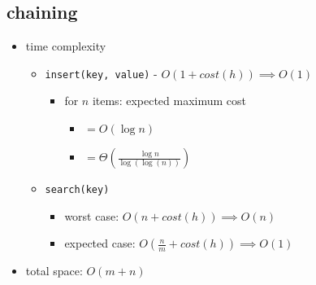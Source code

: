 \documentclass{article}
\newcommand{\code}[1]{\texttt{#1}}
\begin{document}
\begin{multicols*}{3}
    \subsection{chaining}
    \begin{itemize}
        \item time complexity
              \begin{itemize}
                  \item \code{insert(key, value)} - $O(1 + cost(h)) \implies O(1)$
                        \begin{itemize}
                            \item for $n$ items: expected maximum cost
                                  \begin{itemize}
                                      \item $= O(\log n)$
                                      \item $= \Theta(\frac{\log n}{\log(\log(n))})$
                                  \end{itemize}
                        \end{itemize}
                  \item \code{search(key)}
                        \begin{itemize}
                            \item worst case: $O(n + cost(h)) \implies O(n)$
                            \item expected case: $O(\frac{n}{m} + cost(h)) \implies O(1)$
                        \end{itemize}
              \end{itemize}
        \item total space: $O(m + n)$
    \end{itemize}


\end{multicols*}
\end{document}
